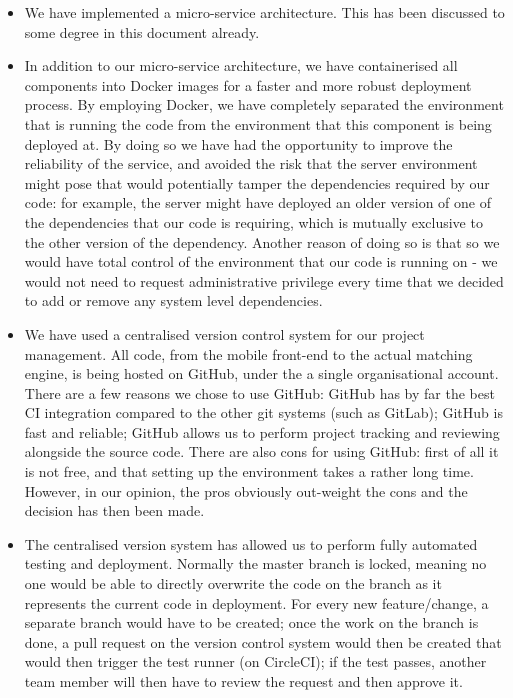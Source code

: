\begin{itemize}
	\item We have implemented a micro-service architecture. This has been discussed to some degree in this document already.
	\item In addition to our micro-service architecture, we have containerised all components into Docker images for a faster and more robust deployment process. By employing Docker, we have completely separated the environment that is running the code from the environment that this component is being deployed at. By doing so we have had the opportunity to improve the reliability of the service, and avoided the risk that the server environment might pose that would potentially tamper the dependencies required by our code: for example, the server might have deployed an older version of one of the dependencies that our code is requiring, which is mutually exclusive to the other version of the dependency. Another reason of doing so is that so we would have total control of the environment that our code is running on - we would not need to request administrative privilege every time that we decided to add or remove any system level dependencies.
	\item We have used a centralised version control system for our project management. All code, from the mobile front-end to the actual matching engine, is being hosted on GitHub, under the a single organisational account. There are a few reasons we chose to use GitHub: GitHub has by far the best CI integration compared to the other git systems (such as GitLab); GitHub is fast and reliable; GitHub allows us to perform project tracking and reviewing alongside the source code. There are also cons for using GitHub: first of all it is not free, and that setting up the environment takes a rather long time. However, in our opinion, the pros obviously out-weight the cons and the decision has then been made.
	\item The centralised version system has allowed us to perform fully automated testing and deployment. Normally the master branch is locked, meaning no one would be able to directly overwrite the code on the branch as it represents the current code in deployment. For every new feature/change, a separate branch would have to be created; once the work on the branch is done, a pull request on the version control system would then be created that would then trigger the test runner (on CircleCI); if the test passes, another team member will then have to review the request and then approve it. 
\end{itemize}

